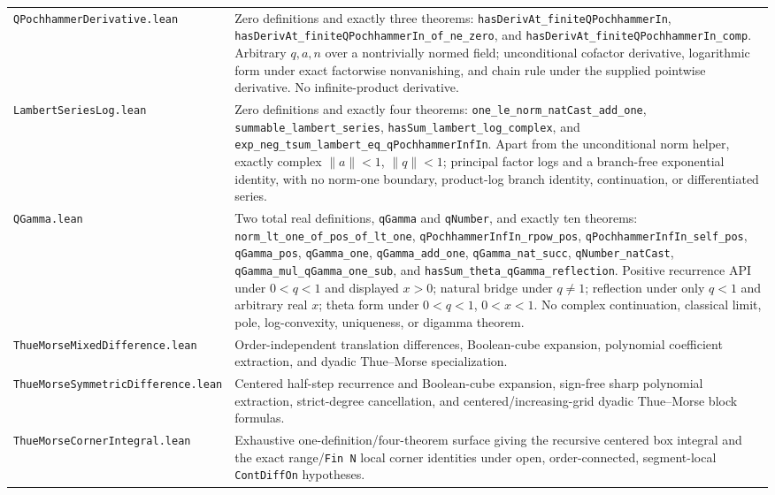 \documentclass[11pt,oneside]{article}
\theoremstyle{definition}
\theoremstyle{remark}
\begin{document}
\begin{longtable}{>{\raggedright\arraybackslash}p{} >{\raggedright\arraybackslash}p{}}
\nolinkurl{QPochhammerDerivative.lean} & Zero definitions and exactly three theorems: \nolinkurl{hasDerivAt_finiteQPochhammerIn}, \nolinkurl{hasDerivAt_finiteQPochhammerIn_of_ne_zero}, and \nolinkurl{hasDerivAt_finiteQPochhammerIn_comp}.  Arbitrary \(q,a,n\) over a nontrivially normed field; unconditional cofactor derivative, logarithmic form under exact factorwise nonvanishing, and chain rule under the supplied pointwise derivative.  No infinite-product derivative. \\
\nolinkurl{LambertSeriesLog.lean} & Zero definitions and exactly four theorems: \nolinkurl{one_le_norm_natCast_add_one}, \nolinkurl{summable_lambert_series}, \nolinkurl{hasSum_lambert_log_complex}, and \nolinkurl{exp_neg_tsum_lambert_eq_qPochhammerInfIn}.  Apart from the unconditional norm helper, exactly complex \(\lVert a\rVert<1\), \(\lVert q\rVert<1\); principal factor logs and a branch-free exponential identity, with no norm-one boundary, product-log branch identity, continuation, or differentiated series. \\
\nolinkurl{QGamma.lean} & Two total real definitions, \nolinkurl{qGamma} and \nolinkurl{qNumber}, and exactly ten theorems: \nolinkurl{norm_lt_one_of_pos_of_lt_one}, \nolinkurl{qPochhammerInfIn_rpow_pos}, \nolinkurl{qPochhammerInfIn_self_pos}, \nolinkurl{qGamma_pos}, \nolinkurl{qGamma_one}, \nolinkurl{qGamma_add_one}, \nolinkurl{qGamma_nat_succ}, \nolinkurl{qNumber_natCast}, \nolinkurl{qGamma_mul_qGamma_one_sub}, and \nolinkurl{hasSum_theta_qGamma_reflection}.  Positive recurrence API under \(0<q<1\) and displayed \(x>0\); natural bridge under \(q\ne1\); reflection under only \(q<1\) and arbitrary real \(x\); theta form under \(0<q<1\), \(0<x<1\).  No complex continuation, classical limit, pole, log-convexity, uniqueness, or digamma theorem. \\
\nolinkurl{ThueMorseMixedDifference.lean} & Order-independent translation differences, Boolean-cube expansion, polynomial coefficient extraction, and dyadic Thue--Morse specialization. \\
\nolinkurl{ThueMorseSymmetricDifference.lean} & Centered half-step recurrence and Boolean-cube expansion, sign-free sharp polynomial extraction, strict-degree cancellation, and centered/increasing-grid dyadic Thue--Morse block formulas. \\
\nolinkurl{ThueMorseCornerIntegral.lean} & Exhaustive one-definition/four-theorem surface giving the recursive centered box integral and the exact range/\nolinkurl{Fin N} local corner identities under open, order-connected, segment-local \nolinkurl{ContDiffOn} hypotheses. \\

\end{longtable}
\end{document}
